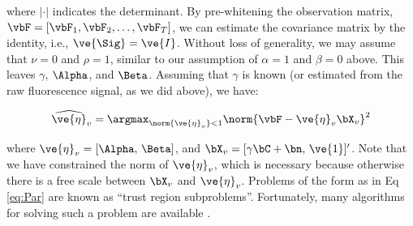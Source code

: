 \noindent where $| \cdot |$ indicates the determinant. By pre-whitening the observation matrix, $\vbF=[\vbF_1, \vbF_2, \ldots, \vbF_T]$, we can estimate the covariance matrix by the identity, i.e., $\ve{\Sig}=\ve{I}$.   Without loss of generality, we may assume that $\nu=0$ and $\rho=1$, similar to our assumption of $\alpha=1$ and $\beta=0$ above. This leaves $\gamma$, $\Alpha$, and $\Beta$. Assuming that $\gamma$ is known (or estimated from the raw fluorescence signal, as we did above), we have: 

\begin{align}
\widehat{\ve{\eta}}_v = \argmax_{\norm{\ve{\eta}_v} <1} \norm{\vbF - \ve{\eta}_v \bX_v}^2 \label{eq:Par}
\end{align}

\noindent where $\ve{\eta}_v=[\Alpha, \, \Beta]$, and $\bX_v=[\gamma \bC + \bn, \, \ve{1}]'$. Note that we have constrained the norm of $\ve{\eta}_v$, which is necessary because otherwise there is a free scale between $\bX_v$ and $\ve{\eta}_v$.  Problems of the form as in Eq \eqref{eq:Par} are known as ``trust region subproblems''.  Fortunately, many algorithms for solving such a problem are available \cite{Fortin00}. 


